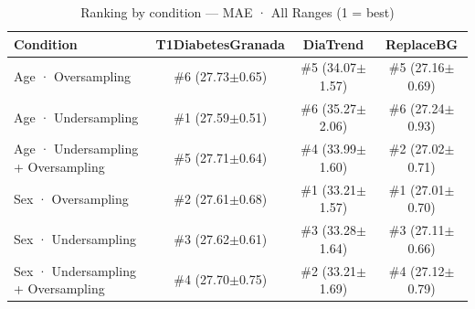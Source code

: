 \begin{table}[htbp]
\centering
\small
\caption{Ranking by condition — MAE · All Ranges  (1 = best)}
\label{tab:ranking_mae_entire_family_mechanism_random}
\begin{tabular}{lccc}
\toprule
\textbf{Condition} & \textbf{T1DiabetesGranada} & \textbf{DiaTrend} & \textbf{ReplaceBG} \\
\midrule
Age · Oversampling & \#6 (27.73$\pm$0.65) & \#5 (34.07$\pm$1.57) & \#5 (27.16$\pm$0.69) \\
Age · Undersampling & \#1 (27.59$\pm$0.51) & \#6 (35.27$\pm$2.06) & \#6 (27.24$\pm$0.93) \\
Age · Undersampling + Oversampling & \#5 (27.71$\pm$0.64) & \#4 (33.99$\pm$1.60) & \#2 (27.02$\pm$0.71) \\
\midrule
Sex · Oversampling & \#2 (27.61$\pm$0.68) & \#1 (33.21$\pm$1.57) & \#1 (27.01$\pm$0.70) \\
Sex · Undersampling & \#3 (27.62$\pm$0.61) & \#3 (33.28$\pm$1.64) & \#3 (27.11$\pm$0.66) \\
Sex · Undersampling + Oversampling & \#4 (27.70$\pm$0.75) & \#2 (33.21$\pm$1.69) & \#4 (27.12$\pm$0.79) \\
\bottomrule
\end{tabular}
\end{table}